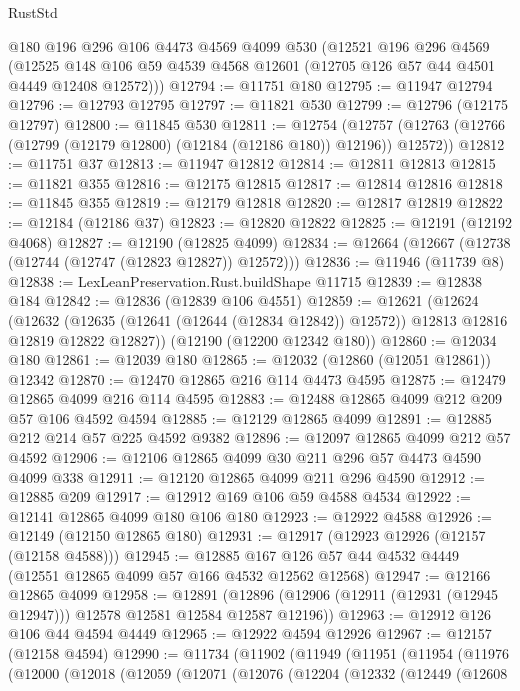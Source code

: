 \begin{lexlean}{RustStd}
\begin{coremodule}
    @180
    @196
    @296
    @106
    @4473
    @4569
    @4099
    @530
    (@12521
      @196
      @296
      @4569
      (@12525 @148 @106 @59 @4539 @4568 @12601 (@12705 @126 @57 @44 @4501 @4449 @12408 @12572)))
@12794 := @11751 @180
@12795 := @11947 @12794
@12796 := @12793 @12795
@12797 := @11821 @530
@12799 := @12796 (@12175 @12797)
@12800 := @11845 @530
@12811 := @12754
    (@12757 (@12763 (@12766 (@12799 (@12179 @12800) (@12184 (@12186 @180)) @12196)) @12572))
@12812 := @11751 @37
@12813 := @11947 @12812
@12814 := @12811 @12813
@12815 := @11821 @355
@12816 := @12175 @12815
@12817 := @12814 @12816
@12818 := @11845 @355
@12819 := @12179 @12818
@12820 := @12817 @12819
@12822 := @12184 (@12186 @37)
@12823 := @12820 @12822
@12825 := @12191 (@12192 @4068)
@12827 := @12190 (@12825 @4099)
@12834 := @12664 (@12667 (@12738 (@12744 (@12747 (@12823 @12827)) @12572)))
@12836 := @11946 (@11739 @8)
@12838 := LexLeanPreservation.Rust.buildShape @11715
@12839 := @12838 @184
@12842 := @12836 (@12839 @106 @4551)
@12859 := @12621
    (@12624
      (@12632 (@12635 (@12641 (@12644 (@12834 @12842)) @12572)) @12813 @12816 @12819 @12822 @12827))
    (@12190 (@12200 @12342 @180))
@12860 := @12034 @180
@12861 := @12039 @180
@12865 := @12032 (@12860 (@12051 @12861)) @12342
@12870 := @12470 @12865 @216 @114 @4473 @4595
@12875 := @12479 @12865 @4099 @216 @114 @4595
@12883 := @12488 @12865 @4099 @212 @209 @57 @106 @4592 @4594
@12885 := @12129 @12865 @4099
@12891 := @12885 @212 @214 @57 @225 @4592 @9382
@12896 := @12097 @12865 @4099 @212 @57 @4592
@12906 := @12106 @12865 @4099 @30 @211 @296 @57 @4473 @4590 @4099 @338
@12911 := @12120 @12865 @4099 @211 @296 @4590
@12912 := @12885 @209
@12917 := @12912 @169 @106 @59 @4588 @4534
@12922 := @12141 @12865 @4099 @180 @106 @180
@12923 := @12922 @4588
@12926 := @12149 (@12150 @12865 @180)
@12931 := @12917 (@12923 @12926 (@12157 (@12158 @4588)))
@12945 := @12885 @167 @126 @57 @44 @4532 @4449 (@12551 @12865 @4099 @57 @166 @4532 @12562 @12568)
@12947 := @12166 @12865 @4099
@12958 := @12891
    (@12896 (@12906 (@12911 (@12931 (@12945 @12947))) @12578 @12581 @12584 @12587 @12196))
@12963 := @12912 @126 @106 @44 @4594 @4449
@12965 := @12922 @4594 @12926
@12967 := @12157 (@12158 @4594)
@12990 := @11734
    (@11902
      (@11949
        (@11951
          (@11954
            (@11976
              (@12000
                (@12018
                  (@12059
                    (@12071
                      (@12076
                        (@12204
                          (@12332
                            (@12449
                              (@12608

\end{coremodule}
\end{lexlean}
